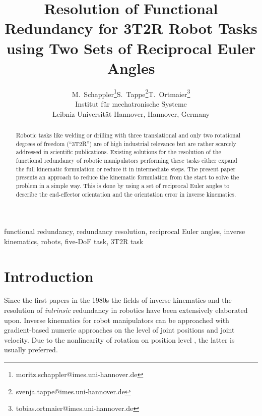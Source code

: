 \documentclass[twocolumn,10pt]{IFTOMM}
\begin{document}
\def\papernumber{IK xxx}
\def\conference_name{15th IFToMM World Congress, Krakow, Poland, 30 June--4 July, 2019}
\title{Resolution of Functional Redundancy for 3T2R Robot Tasks  \\ using Two Sets of Reciprocal Euler Angles}

\author{
    \begin{tabular}{cccc}
    M.\ Schappler\thanks{moritz.schappler@imes.uni-hannover.de}
& S.\ Tappe\thanks{svenja.tappe@imes.uni-hannover.de}
& T.\ Ortmaier\thanks{tobias.ortmaier@imes.uni-hannover.de}\\
    \multicolumn{3}{c}{Institut für mechatronische Systeme} \\
    \multicolumn{3}{c}{Leibniz Universität Hannover, Hannover, Germany}
    \end{tabular}
}

\maketitle

\begin{abstract}
Robotic tasks like welding or drilling with three translational and only two rotational degrees of freedom (``3T2R'') are of high industrial relevance but are rather scarcely addressed in scientific publications.
Existing solutions for the resolution of the functional redundancy of robotic manipulators performing these tasks either expand the full kinematic formulation or reduce it in intermediate steps.
The present paper presents an approach to reduce the kinematic formulation from the start to solve the problem in a simple way.
This is done by using a set of reciprocal Euler angles to describe the end-effector orientation and the orientation error in inverse kinematics.
\end{abstract}

\begin{keywords}
functional redundancy, redundancy resolution, reciprocal Euler angles, inverse kinematics, robots, five-DoF task, 3T2R task
\end{keywords}

\section{Introduction}
\label{sec:Intro}
Since the first papers in the 1980s the fields of inverse kinematics \cite{GoldenbergBenFen1985} and the resolution of \emph{intrinsic} redundancy \cite{Yoshikawa1984} in robotics have been extensively elaborated upon.
Inverse kinematics for robot manipulators can be approached with gradient-based numeric approaches on the level of joint positions and joint velocity.
Due to the nonlinearity of rotation on position level \cite{GoldenbergBenFen1985}, the latter is usually preferred.
\end{document}
